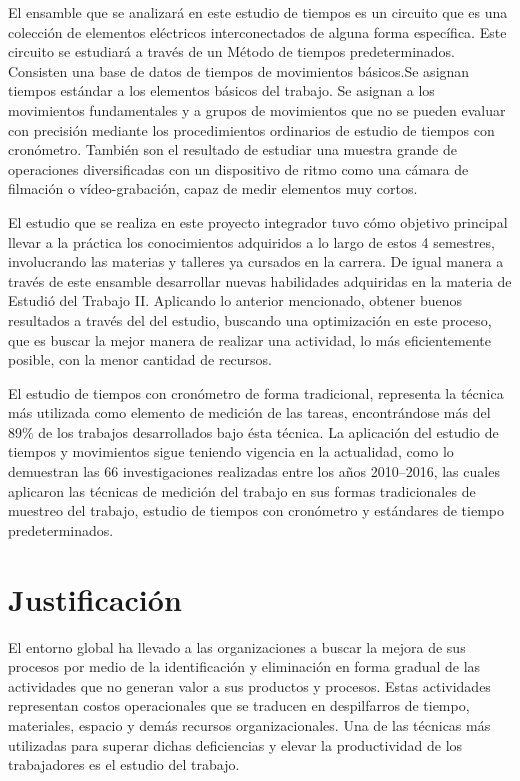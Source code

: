 El ensamble que se analizará en este estudio de tiempos es un circuito  que es una colección de elementos eléctricos interconectados de alguna forma específica. Este circuito se estudiará a través de un Método de tiempos predeterminados. Consisten una base de datos de tiempos de movimientos básicos.Se asignan tiempos estándar a los elementos básicos del trabajo. Se asignan a los movimientos fundamentales y a grupos de movimientos que no se pueden evaluar con precisión mediante los procedimientos ordinarios de estudio de tiempos con cronómetro. También son el resultado de estudiar una muestra grande de operaciones diversificadas con un dispositivo de ritmo como una cámara de filmación o vídeo-grabación, capaz de medir elementos muy cortos.

El estudio que se realiza en este proyecto integrador tuvo cómo objetivo principal llevar a la práctica los conocimientos adquiridos a lo largo de estos 4 semestres, involucrando las materias y talleres ya cursados en la carrera. De igual manera a través de este ensamble desarrollar nuevas habilidades adquiridas en la materia de Estudió del Trabajo II. Aplicando lo anterior mencionado, obtener buenos resultados a través del del estudio, buscando  una optimización en este proceso, que es buscar la mejor manera de realizar una actividad, lo más eficientemente posible, con la menor cantidad de recursos.

El estudio de tiempos con cronómetro de forma tradicional, representa la técnica más utilizada como elemento de medición de las tareas, encontrándose más del 89\% de los trabajos desarrollados bajo ésta técnica.
La aplicación del estudio de tiempos y movimientos sigue teniendo vigencia en la actualidad, como lo demuestran las 66 investigaciones realizadas entre los años 2010–2016, las cuales aplicaron las técnicas de medición del trabajo en sus formas tradicionales de muestreo del trabajo, estudio de tiempos con cronómetro y estándares de tiempo predeterminados.
\cite{andrade2019estudio}

 
% 
% 
\section{Justificación}

El entorno global ha llevado a las organizaciones a buscar la mejora de sus procesos por medio de la identificación y eliminación en forma gradual de las actividades que no generan valor a sus productos y procesos. Estas actividades representan costos operacionales que se traducen en despilfarros de tiempo, materiales, espacio y demás recursos organizacionales. Una de las técnicas más utilizadas para superar dichas deficiencias y elevar la productividad de los trabajadores es el estudio del trabajo.
    

